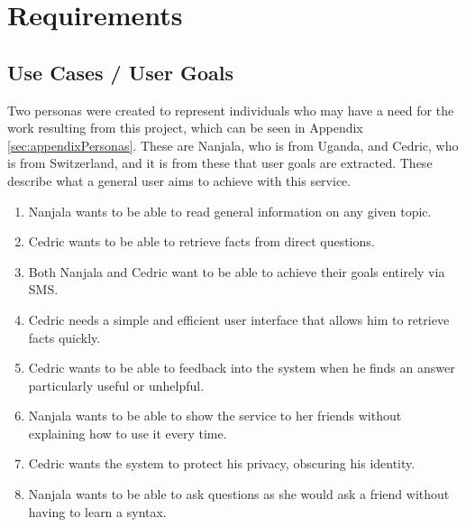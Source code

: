 \documentclass[authoryearcitations]{UoYCSproject}
\begin{document}
\section{Requirements}
\subsection{Use Cases / User Goals}
Two personas were created to represent individuals who may have a need for the work resulting from this project, which can be seen in Appendix \ref{sec:appendixPersonas}. These are Nanjala, who is from Uganda, and Cedric, who is from Switzerland, and it is from these that user goals are extracted. These describe what a general user aims to achieve with this service.
\begin{enumerate}
  \item Nanjala wants to be able to read general information on any given topic.
  \item Cedric wants to be able to retrieve facts from direct questions.
  \item Both Nanjala and Cedric want to be able to achieve their goals entirely via SMS.
  \item Cedric needs a simple and efficient user interface that allows him to retrieve facts quickly. 
  \item Cedric wants to be able to feedback into the system when he finds an answer particularly useful or unhelpful. 
  \item Nanjala wants to be able to show the service to her friends without explaining how to use it every time.
  \item Cedric wants the system to protect his privacy, obscuring his identity.
  \item Nanjala wants to be able to ask questions as she would ask a friend without having to learn a syntax.
\end{enumerate}
\end{document}
